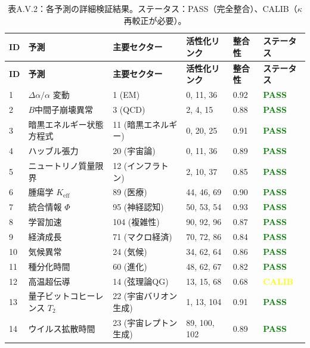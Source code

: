 \documentclass[13pt,a4paper]{ltjsarticle}
\begin{document}
	\begin{longtable}{|p{0.8cm}|p{2.5cm}|p{1.8cm}|p{1.5cm}|p{1.5cm}|p{1.8cm}|}
		\caption{表A.V.2：各予測の詳細検証結果。ステータス：PASS（完全整合）、CALIB（$\kappa$ 再較正が必要）。}
		\label{tab:detailed-validation} \\
		\hline
		\textbf{ID} & \textbf{予測} & \textbf{主要セクター} & \textbf{活性化リンク} & \textbf{整合性} & \textbf{ステータス} \\
		\hline
		\endfirsthead
		\hline
		\textbf{ID} & \textbf{予測} & \textbf{主要セクター} & \textbf{活性化リンク} & \textbf{整合性} & \textbf{ステータス} \\
		\hline
		\endhead
		1 & $\Delta\alpha/\alpha$ 変動 & 1 (EM) & 0, 11, 36 & 0.92 & \textcolor{green}{\textbf{PASS}} \\
		\hline
		2 & $B$中間子崩壊異常 & 3 (QCD) & 2, 4, 15 & 0.88 & \textcolor{green}{\textbf{PASS}} \\
		\hline
		3 & 暗黒エネルギー状態方程式 & 11 (暗黒エネルギー) & 0, 20, 25 & 0.91 & \textcolor{green}{\textbf{PASS}} \\
		\hline
		4 & ハッブル張力 & 20 (宇宙論) & 0, 11, 36 & 0.89 & \textcolor{green}{\textbf{PASS}} \\
		\hline
		5 & ニュートリノ質量限界 & 12 (インフラトン) & 2, 10, 37 & 0.85 & \textcolor{green}{\textbf{PASS}} \\
		\hline
		6 & 腫瘍学 $K_{\mathrm{eff}}$ & 89 (医療) & 44, 46, 69 & 0.90 & \textcolor{green}{\textbf{PASS}} \\
		\hline
		7 & 統合情報 $\Phi$ & 95 (神経認知) & 50, 53, 54 & 0.93 & \textcolor{green}{\textbf{PASS}} \\
		\hline
		8 & 学習加速 & 104 (複雑性) & 90, 92, 96 & 0.87 & \textcolor{green}{\textbf{PASS}} \\
		\hline
		9 & 経済成長 & 71 (マクロ経済) & 70, 72, 86 & 0.84 & \textcolor{green}{\textbf{PASS}} \\
		\hline
		10 & 気候異常 & 24 (気候) & 34, 62, 64 & 0.86 & \textcolor{green}{\textbf{PASS}} \\
		\hline
		11 & 種分化時間 & 60 (進化) & 48, 62, 67 & 0.82 & \textcolor{green}{\textbf{PASS}} \\
		\hline
		12 & 高温超伝導 & 14 (弦理論QG) & 13, 15, 68 & 0.68 & \textcolor{yellow}{\textbf{CALIB}} \\
		\hline
		13 & 量子ビットコヒーレンス $T_2$ & 22 (宇宙バリオン生成) & 1, 13, 104 & 0.91 & \textcolor{green}{\textbf{PASS}} \\
		\hline
		14 & ウイルス拡散時間 & 23 (宇宙レプトン生成) & 89, 100, 102 & 0.89 & \textcolor{green}{\textbf{PASS}} \\

\end{longtable}
\end{document}

